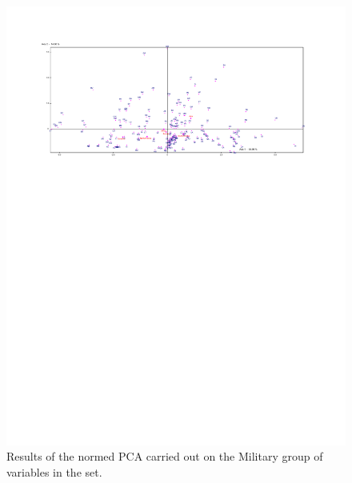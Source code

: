 \documentclass[a4paper,10pt,twocolumn]{article}
\begin{document}
\begin{figure}[!ht]
\begin{center}
\includegraphics[width=17cm]{p6b.pdf}
\caption{\footnotesize{Results of the normed PCA carried out on the Military group of variables in the set.}\label{p6}}
\end{center}
\end{figure}
\end{document}
